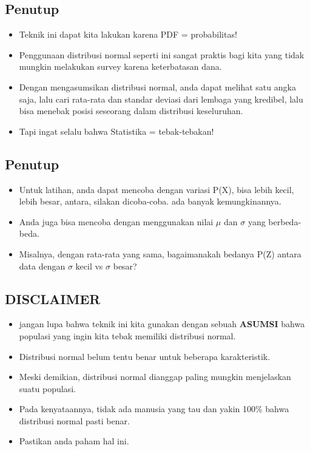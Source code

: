 \documentclass[
  letterpaper,
  DIV=11,
  numbers=noendperiod]{scrartcl}
\begin{document}
\hypertarget{penutup}{%
\subsection{Penutup}\label{penutup}}

\begin{itemize}
\item
  Teknik ini dapat kita lakukan karena PDF = probabilitas!
\item
  Penggunaan distribusi normal seperti ini sangat praktis bagi kita yang
  tidak mungkin melakukan survey karena keterbatasan dana.
\item
  Dengan mengasumsikan distribusi normal, anda dapat melihat satu angka
  saja, lalu cari rata-rata dan standar deviasi dari lembaga yang
  kredibel, lalu bisa menebak posisi seseorang dalam distribusi
  keseluruhan.
\item
  Tapi ingat selalu bahwa Statistika = tebak-tebakan!
\end{itemize}

\hypertarget{penutup-1}{%
\subsection{Penutup}\label{penutup-1}}

\begin{itemize}
\item
  Untuk latihan, anda dapat mencoba dengan variasi P(X), bisa lebih
  kecil, lebih besar, antara, silakan dicoba-coba. ada banyak
  kemungkinannya.
\item
  Anda juga bisa mencoba dengan menggunakan nilai \(\mu\) dan \(\sigma\)
  yang berbeda-beda.
\item
  Misalnya, dengan rata-rata yang sama, bagaimanakah bedanya P(Z) antara
  data dengan \(\sigma\) kecil vs \(\sigma\) besar?
\end{itemize}

\hypertarget{disclaimer}{%
\subsection{DISCLAIMER}\label{disclaimer}}

\begin{itemize}
\item
  jangan lupa bahwa teknik ini kita gunakan dengan sebuah
  \textbf{ASUMSI} bahwa populasi yang ingin kita tebak memiliki
  distribusi normal.
\item
  Distribusi normal belum tentu benar untuk beberapa karakteristik.
\item
  Meski demikian, distribusi normal dianggap paling mungkin menjelaskan
  suatu populasi.
\item
  Pada kenyataannya, tidak ada manusia yang tau dan yakin 100\% bahwa
  distribusi normal pasti benar.
\item
  Pastikan anda paham hal ini.
\end{itemize}
\end{document}
